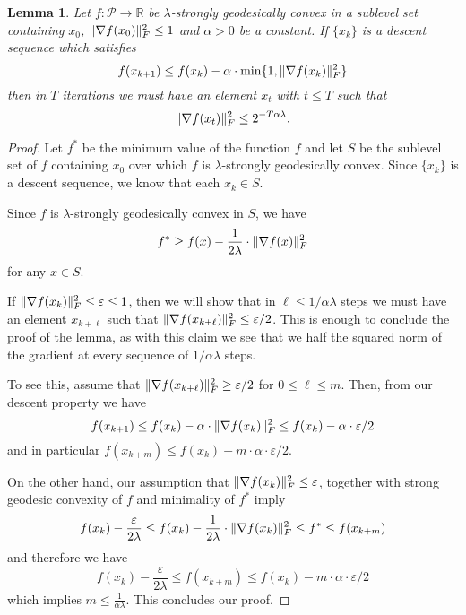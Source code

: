 \documentclass[aos]{imsart}
\newtheorem{lemma}[theorem]{Lemma}
\theoremstyle{definition}
\numberwithin{equation}{section}
\DeclarePairedDelimiter{\norm}{\lVert}{\rVert}
\newcommand{\R}{{\mathbb{R}}}
\newcommand{\SPD}{\mathcal{P}}
\begin{document}
\begin{lemma}\label{lem:descent-sublevel-set}
	Let $f : \SPD \rightarrow \R$ be $\lambda$-strongly geodesically convex in a sublevel set containing $x_0$, $\norm{\nabla f(x_0)}_F^2 \leq 1$ and $\alpha > 0$ be a constant.
	If $\{x_k\}$ is a descent sequence which satisfies
	$$ f(x_{k+1}) \leq f(x_k) - \alpha \cdot \min\{1,  \norm{\nabla f(x_k)}^2_F \} $$
	then in $T$ iterations we must have an element $x_t$ with $t\leq T$ such that
	$$ \norm{\nabla f(x_t)}^2_F \leq 2^{-T \alpha \lambda}.   $$
\end{lemma}

\begin{proof}
	Let $f^*$ be the minimum value of the function $f$ and let $S$ be the sublevel set of $f$ containing $x_0$ over which $f$ is $\lambda$-strongly geodesically convex. Since $\{x_k\}$ is a descent sequence, we know that each $x_k \in S$.

	Since $f$ is $\lambda$-strongly geodesically convex in $S$, we have
	$$ f^* \geq f(x) - \frac{1}{2\lambda} \cdot \norm{\nabla f(x)}_F^2 $$
	for any $x \in S$.

	If $\norm{\nabla f(x_k)}_F^2 \leq \varepsilon \leq 1$, then we will show that in $\ell \leq 1/\alpha \lambda$ steps we must have an element $x_{k+\ell}$ such that $\norm{\nabla f(x_{k + \ell})}_F^2 \leq \varepsilon/2$. This is enough to conclude the proof of the lemma, as with this claim we see that we half the squared norm of the gradient at every sequence of $1/\alpha \lambda$ steps.

	To see this, assume that $\norm{\nabla f(x_{k+\ell})}_F^2 \geq \varepsilon/2$ for $0 \leq \ell \leq m$. Then, from our descent property we have
	$$ f(x_{k+1}) \leq f(x_k) - \alpha \cdot \norm{\nabla f(x_k)}^2_F \leq f(x_k) - \alpha \cdot \varepsilon/2$$
	and in particular $f(x_{k + m}) \leq f(x_k) - m \cdot \alpha \cdot \varepsilon/2$.

	On the other hand, our assumption that $\norm{\nabla f(x_k)}_F^2 \leq \varepsilon$, together with strong geodesic convexity of $f$ and minimality of $f^*$ imply
	$$ f(x_{k}) - \frac{\varepsilon}{2\lambda} \leq f(x_{k}) - \frac{1}{2\lambda} \cdot \norm{\nabla f(x_k)}_F^2 \leq f^* \leq f(x_{k+m}) $$
	and therefore we have
	$$ f(x_{k}) - \frac{\varepsilon}{2\lambda} \leq f(x_{k + m}) \leq f(x_k) - m \cdot \alpha \cdot \varepsilon/2 $$
	which implies $m \leq \frac{1}{\alpha \lambda}$. This concludes our proof.
\end{proof}

\end{document}
